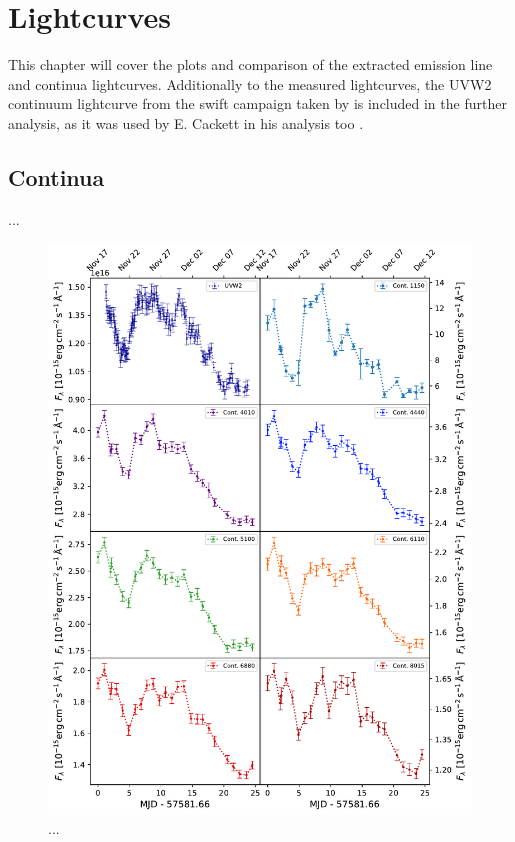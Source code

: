 \section{Lightcurves}

This chapter will cover the plots and comparison of the extracted emission line and continua lightcurves. Additionally to the measured lightcurves, the UVW2 continuum lightcurve from the swift campaign taken by \parencite{mchardy2018x} is included in the further analysis, as it was used by E. Cackett in his analysis too \parencite{cackett2018accretion}. 


\subsection{Continua}
...
\begin{figure}[!ht]
	\centering
	\includegraphics[width=\textwidth]{pictures/Chapter4/lightcurves/NGC4593_Continua.pdf}
	\caption{...}
	\label{fig:continua_lightcurves}
\end{figure}

